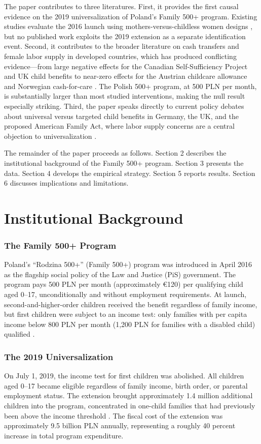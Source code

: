 \documentclass[12pt]{article}
\begin{document}
The paper contributes to three literatures. First, it provides the first causal evidence on the 2019 universalization of Poland's Family 500+ program. Existing studies evaluate the 2016 launch using mothers-versus-childless women designs \citep{magda2018, myck2019}, but no published work exploits the 2019 extension as a separate identification event. Second, it contributes to the broader literature on cash transfers and female labor supply in developed countries, which has produced conflicting evidence---from large negative effects for the Canadian Self-Sufficiency Project \citep{card2005} and UK child benefits \citep{brewer2006} to near-zero effects for the Austrian childcare allowance \citep{lalive2014} and Norwegian cash-for-care \citep{schone2004}. The Polish 500+ program, at 500 PLN per month, is substantially larger than most studied interventions, making the null result especially striking. Third, the paper speaks directly to current policy debates about universal versus targeted child benefits in Germany, the UK, and the proposed American Family Act, where labor supply concerns are a central objection to universalization \citep{hoynes2016, dahl2014}.

The remainder of the paper proceeds as follows. Section 2 describes the institutional background of the Family 500+ program. Section 3 presents the data. Section 4 develops the empirical strategy. Section 5 reports results. Section 6 discusses implications and limitations.


\section{Institutional Background}

\subsubsection*{The Family 500+ Program}  Poland's ``Rodzina 500+'' (Family 500+) program was introduced in April 2016 as the flagship social policy of the Law and Justice (PiS) government. The program pays 500 PLN per month (approximately \euro{}120) per qualifying child aged 0--17, unconditionally and without employment requirements. At launch, second-and-higher-order children received the benefit regardless of family income, but first children were subject to an income test: only families with per capita income below 800 PLN per month (1,200 PLN for families with a disabled child) qualified \citep{goraus2019}.

\subsubsection*{The 2019 Universalization}  On July 1, 2019, the income test for first children was abolished. All children aged 0--17 became eligible regardless of family income, birth order, or parental employment status. The extension brought approximately 1.4 million additional children into the program, concentrated in one-child families that had previously been above the income threshold \citep{myck2019}. The fiscal cost of the extension was approximately 9.5 billion PLN annually, representing a roughly 40 percent increase in total program expenditure.
\end{document}
